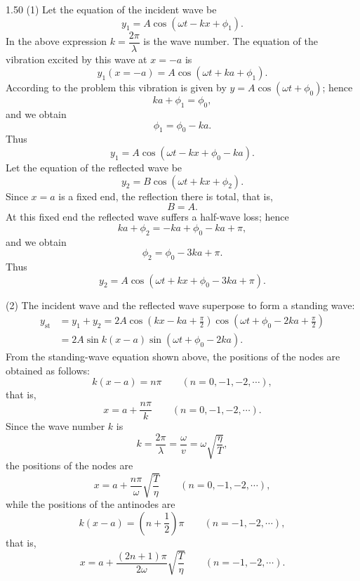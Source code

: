 \begin{solution}{1.50}
(1) Let the equation of the incident wave be
\[
y_1=A\cos\left(\omega t-kx+\phi_1\right).
\]
In the above expression $k=\dfrac{2\pi}{\lambda}$ is the wave number. The equation of the vibration excited by this wave at $x=-a$ is
\[
y_1(x=-a)=A\cos\left(\omega t+ka+\phi_1\right).
\]
According to the problem this vibration is given by $y=A\cos(\omega t+\phi_0)$; hence
\[
ka+\phi_1=\phi_0,
\]
and we obtain
\[
\phi_1=\phi_0-ka.
\]
Thus
\[
y_1=A\cos\left(\omega t-kx+\phi_0-ka\right).
\]
Let the equation of the reflected wave be
\[
y_2=B\cos\left(\omega t+kx+\phi_2\right).
\]
Since $x=a$ is a fixed end, the reflection there is total, that is,
\[
B=A.
\]
At this fixed end the reflected wave suffers a half-wave loss; hence
\[
ka+\phi_2=-ka+\phi_0-ka+\pi,
\]
and we obtain
\[
\phi_2=\phi_0-3ka+\pi.
\]
Thus
\[
y_2=A\cos\left(\omega t+kx+\phi_0-3ka+\pi\right).
\]

(2) The incident wave and the reflected wave superpose to form a standing wave:
\[
\begin{aligned}
y_{\text{st}}&=y_1+y_2
=2A\cos\left(kx-ka+\frac{\pi}{2}\right)\cos\left(\omega t+\phi_0-2ka+\frac{\pi}{2}\right)\\
&=2A\sin k(x-a)\sin\left(\omega t+\phi_0-2ka\right).
\end{aligned}
\]
From the standing-wave equation shown above, the positions of the nodes are obtained as follows:
\[
k(x-a)=n\pi\qquad(n=0,-1,-2,\cdots),
\]
that is,
\[
x=a+\frac{n\pi}{k}\qquad(n=0,-1,-2,\cdots).
\]
Since the wave number $k$ is
\[
k=\frac{2\pi}{\lambda}=\frac{\omega}{v}=\omega\sqrt{\frac{\eta}{T}},
\]
the positions of the nodes are
\[
x=a+\frac{n\pi}{\omega}\sqrt{\frac{T}{\eta}}\qquad(n=0,-1,-2,\cdots),
\]
while the positions of the antinodes are
\[
k(x-a)=\left(n+\frac{1}{2}\right)\pi\qquad(n=-1,-2,\cdots),
\]
that is,
\[
x=a+\frac{(2n+1)\pi}{2\omega}\sqrt{\frac{T}{\eta}}\qquad(n=-1,-2,\cdots).
\]


\end{solution}
